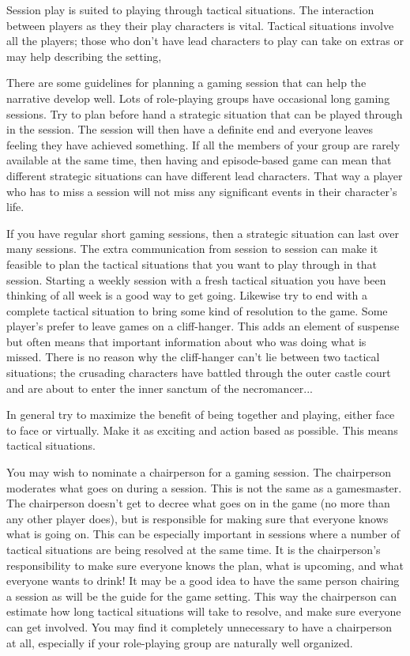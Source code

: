 \documentclass[twoside]{book}
\begin{document}
Session play is suited to playing through tactical situations. The
interaction between players as they their play characters is
vital. Tactical situations involve all the players; those who don't
have lead characters to play can take on extras or may help describing
the setting,

There are some guidelines for planning a gaming session that can help
the narrative develop well. Lots of role-playing groups have
occasional long gaming sessions. Try to plan before hand a strategic
situation that can be played through in the session. The session will
then have a definite end and everyone leaves feeling they have
achieved something. If all the members of your group are rarely
available at the same time, then having and episode-based game can
mean that different strategic situations can have different lead
characters. That way a player who has to miss a session will not miss
any significant events in their character's life.

If you have regular short gaming sessions, then a strategic situation
can last over many sessions. The extra communication from session to
session can make it feasible to plan the tactical situations that you
want to play through in that session. Starting a weekly session with a
fresh tactical situation you have been thinking of all week is a good
way to get going. Likewise try to end with a complete tactical
situation to bring some kind of resolution to the game. Some player's
prefer to leave games on a cliff-hanger. This adds an element of
suspense but often means that important information about who was
doing what is missed. There is no reason why the cliff-hanger can't
lie between two tactical situations; the crusading characters have
battled through the outer castle court and are about to enter the
inner sanctum of the necromancer...

In general try to maximize the benefit of being together and playing,
either face to face or virtually. Make it as exciting and action based
as possible. This means tactical situations.

You may wish to nominate a chairperson for a gaming session. The
chairperson moderates what goes on during a session. This is not the
same as a gamesmaster. The chairperson doesn't get to decree what goes
on in the game (no more than any other player does), but is
responsible for making sure that everyone knows what is going on. This
can be especially important in sessions where a number of tactical
situations are being resolved at the same time. It is the
chairperson's responsibility to make sure everyone knows the plan,
what is upcoming, and what everyone wants to drink! It may be a good
idea to have the same person chairing a session as will be the guide
for the game setting. This way the chairperson can estimate how long
tactical situations will take to resolve, and make sure everyone can
get involved. You may find it completely unnecessary to have a
chairperson at all, especially if your role-playing group are
naturally well organized.
\end{document}
